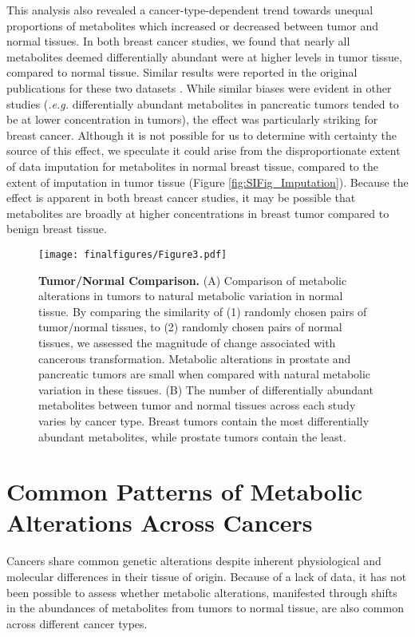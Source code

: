 \documentclass[10pt]{article}
\begin{document}
This analysis also revealed a cancer-type-dependent trend towards unequal proportions of metabolites which increased or decreased between tumor and normal tissues. In both breast cancer studies, we found that nearly all metabolites deemed differentially abundant were at higher levels in tumor tissue, compared to normal tissue. Similar results were reported in the original publications for these two datasets \cite{Terunuma2014,Tang2015}. While similar biases were evident in other studies (\textit{.e.g.} differentially abundant metabolites in pancreatic tumors tended to be at lower concentration in tumors), the effect was particularly striking for breast cancer. Although it is not possible for us to determine with certainty the source of this effect, we speculate it could arise from the disproportionate extent of data imputation for metabolites in normal breast tissue, compared to the extent of imputation in tumor tissue (Figure \ref{fig:SIFig_Imputation}). Because the effect is apparent in both breast cancer studies, it may be possible that metabolites are broadly at higher concentrations in breast tumor compared to benign breast tissue.

\begin{figure}[ht!]
  \centering
     \texttt{[image: finalfigures/Figure3.pdf]}
  \caption{\textbf{Tumor/Normal Comparison.} (A) Comparison of metabolic alterations in tumors to natural metabolic variation in normal tissue. By comparing the similarity of (1) randomly chosen pairs of tumor/normal tissues, to (2) randomly chosen pairs of normal tissues, we assessed the magnitude of change associated with cancerous transformation. Metabolic alterations in prostate and pancreatic tumors are small when compared with natural metabolic variation in these tissues. (B) The number of differentially abundant metabolites between tumor and normal tissues across each study varies by cancer type. Breast tumors contain the most differentially abundant metabolites, while prostate tumors contain the least. }
     \label{fig:Fig3}
\end{figure}

\section{Common Patterns of Metabolic Alterations Across Cancers}
Cancers share common genetic alterations despite inherent physiological and molecular differences in their tissue of origin. Because of a lack of data, it has not been possible to assess whether metabolic alterations, manifested through shifts in the abundances of metabolites from tumors to normal tissue, are also common across different cancer types. 
\end{document}
